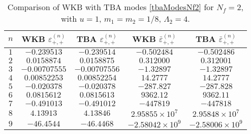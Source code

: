 \documentclass[11pt,a4paper]{elsarticle}
\numberwithin{figure}{section}
\numberwithin{table}{section}
\begin{document}
\begin{table}[t]
\begin{tabular}{c|c|c|c|c}
$n$ & WKB $\varepsilon_{+,+}^{(n)}$ & TBA  $\varepsilon_{+,+}^{(n)}$ & WKB  $\bar\varepsilon_{+,+}^{(n)} $& TBA  $\bar\varepsilon_{+,+}^{(n)}$ \\
\hline
$ 1 $&$ -0.239513 $&$ -0.239514$ & $-0.502484 $& $-0.502486$ \\
 $2$ & $0.0158874$ & $0.0158875$ &$ 0.312000$  & $0.312001$ \\
$ 3 $& $-0.00707555 $& $-0.00707556$ &$ -1.32897 $& $-1.32897$ \\
 $4$ &$ 0.00852253 $& $0.00852254$ &$ 14.2777$  & $14.2777$ \\
$ 5$ & $-0.020378 $& $-0.020378$ & $-287.827$ & $-287.828$\\
 $6$ &$ 0.0815612 $& $0.0815613$ & $9362.12 $  & $9362.11$ \\
 $7$ & $-0.491013 $&$ -0.491012$ & $-447819$ & $-447818$ \\
 $8$ & $ 4.13913 $& $4.13846$ & $2.95855\times 10^7  $& $2.95848\times 10^7$ \\
$ 9 $&$ -46.4544$ &$ -46.4468$ & $-2.58042\times 10^9$ & $-2.58006\times 10^9$ \\
 \end{tabular}
\caption{Comparison of WKB with TBA modes \eqref{tbaModesNf2} for $N_f=2$, with $u=1$, $m_1=m_2=1/8$, $\Lambda_2=4$.}\label{tab:higherWKBNf2}
\end{table}
\end{document}
